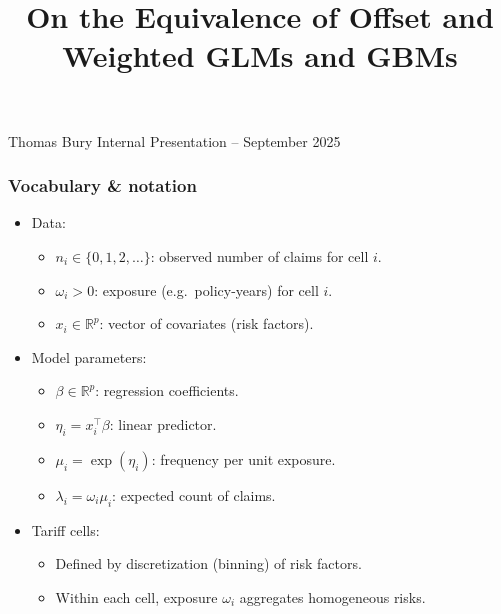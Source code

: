 \documentclass[10pt,aspectratio=169,xcolor={dvipsnames},usepdftitle=false]{beamer}
\begin{document}
\title{On the Equivalence of Offset and Weighted GLMs and GBMs}

\information
{Thomas Bury}
{Internal Presentation -- September 2025}

\frame{\titlepage}

\begin{frame}
\end{frame}

\begin{frame}
\frametitle{Vocabulary \& notation}
\small
\begin{itemize}
\item Data: 
  \begin{itemize}
    \item $n_i \in \{0,1,2,\dots\}$: observed number of claims for cell $i$.
    \item $\omega_i > 0$: exposure (e.g.\ policy-years) for cell $i$.
    \item $x_i \in \mathbb{R}^p$: vector of covariates (risk factors). 
  \end{itemize}
\item Model parameters:
  \begin{itemize}
    \item $\beta \in \mathbb{R}^p$: regression coefficients.
    \item $\eta_i = x_i^\top \beta$: linear predictor.
    \item $\mu_i = \exp(\eta_i)$: frequency per unit exposure.
    \item $\lambda_i = \omega_i \mu_i$: expected count of claims.
  \end{itemize}
\item Tariff cells:
  \begin{itemize}
    \item Defined by discretization (binning) of risk factors.
    \item Within each cell, exposure $\omega_i$ aggregates homogeneous risks.
  \end{itemize}
\end{itemize}
\end{frame}


\begin{frame}
\end{frame}
\end{document}
